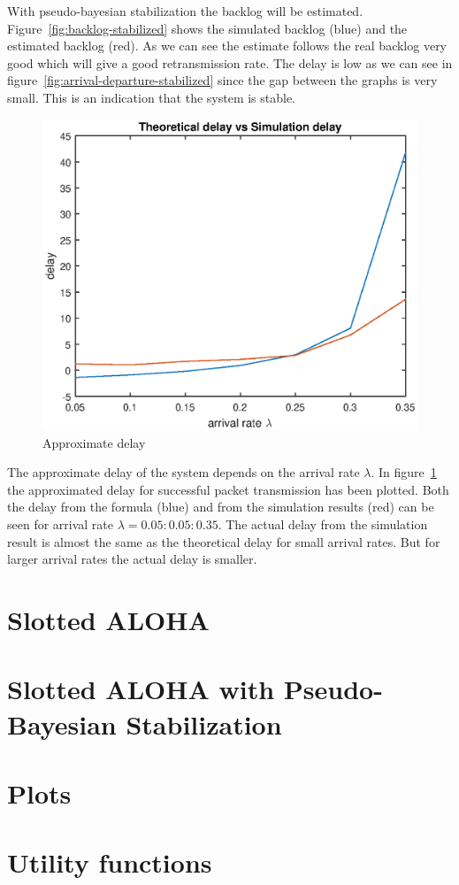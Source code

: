 \documentclass{article}
\begin{document}
With pseudo-bayesian stabilization the backlog will be estimated. Figure~\ref{fig:backlog-stabilized} shows the simulated backlog (blue) and the estimated backlog (red). As we can see the estimate follows the real backlog very good which will give a good retransmission rate. The delay is low as we can see in figure~\ref{fig:arrival-departure-stabilized} since the gap between the graphs is very small. This is an indication that the system is stable.

\begin{figure}[h]
  \centering
  \includegraphics[width=.5\textwidth]{figures/approximate-delay.eps}
  \caption{Approximate delay}
  \label{fig:approximate-delay}
\end{figure}

The approximate delay of the system depends on the arrival rate $\lambda$. In figure~\ref{fig:approximate-delay} the approximated delay for successful packet transmission has been plotted. Both the delay from the formula (blue) and from the simulation results (red) can be seen for arrival rate $\lambda = 0.05:0.05:0.35$. The actual delay from the simulation result is almost the same as the theoretical delay for small arrival rates. But for larger arrival rates the actual delay is smaller. 

\newpage
\appendix
\section{Slotted ALOHA}


\newpage
\section{Slotted ALOHA with Pseudo-Bayesian Stabilization}


\newpage
\section{Plots}


\section{Utility functions}


\end{document}
